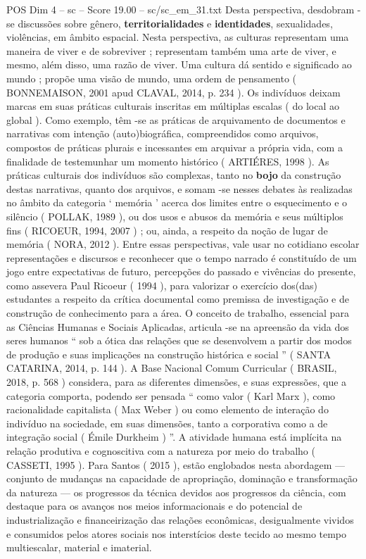 \begin{textsample}{POS Dim 4 – sc – Score 19.00 – sc/sc\_em\_31.txt}
Desta perspectiva, desdobram -se discussões sobre gênero, \textbf{territorialidades} e \textbf{identidades}, sexualidades, violências, em âmbito espacial.
Nesta perspectiva, as culturas representam uma maneira de viver e de sobreviver ; representam também uma arte de viver, e mesmo, além disso, uma razão de viver.
Uma cultura dá sentido e significado ao mundo ; propõe uma visão de mundo, uma ordem de pensamento ( BONNEMAISON, 2001 apud CLAVAL, 2014, p. 234 ).
Os indivíduos deixam marcas em suas práticas culturais inscritas em múltiplas escalas ( do local ao global ).
Como exemplo, têm -se as práticas de arquivamento de documentos e narrativas com intenção (auto)biográfica, compreendidos como arquivos, compostos de práticas plurais e incessantes em arquivar a própria vida, com a finalidade de testemunhar um momento histórico ( ARTIÉRES, 1998 ).
As práticas culturais dos indivíduos são complexas, tanto no \textbf{bojo} da construção destas narrativas, quanto dos arquivos, e somam -se nesses debates às realizadas no âmbito da categoria ‘ memória ’ acerca dos limites entre o esquecimento e o silêncio ( POLLAK, 1989 ), ou dos usos e abusos da memória e seus múltiplos fins ( RICOEUR, 1994, 2007 ) ; ou, ainda, a respeito da noção de lugar de memória ( NORA, 2012 ).
Entre essas perspectivas, vale usar no cotidiano escolar representações e discursos e reconhecer que o tempo narrado é constituído de um jogo entre expectativas de futuro, percepções do passado e vivências do presente, como assevera Paul Ricoeur ( 1994 ), para valorizar o exercício dos(das) estudantes a respeito da crítica documental como premissa de investigação e de construção de conhecimento para a área.
O conceito de trabalho, essencial para as Ciências Humanas e Sociais Aplicadas, articula -se na apreensão da vida dos seres humanos “ sob a ótica das relações que se desenvolvem a partir dos modos de produção e suas implicações na construção histórica e social ” ( SANTA CATARINA, 2014, p. 144 ).
A Base Nacional Comum Curricular ( BRASIL, 2018, p. 568 ) considera, para as diferentes dimensões, e suas expressões, que a categoria comporta, podendo ser pensada “ como valor ( Karl Marx ), como racionalidade capitalista ( Max Weber ) ou como elemento de interação do indivíduo na sociedade, em suas dimensões, tanto a corporativa como a de integração social ( Émile Durkheim ) ”.
A atividade humana está implícita na relação produtiva e cognoscitiva com a natureza por meio do trabalho ( CASSETI, 1995 ).
Para Santos ( 2015 ), estão englobados nesta abordagem — conjunto de mudanças na capacidade de apropriação, dominação e transformação da natureza — os progressos da técnica devidos aos progressos da ciência, com destaque para os avanços nos meios informacionais e do potencial de industrialização e financeirização das relações econômicas, desigualmente vividos e consumidos pelos atores sociais nos interstícios deste tecido ao mesmo tempo multiescalar, material e imaterial.

\end{textsample}
